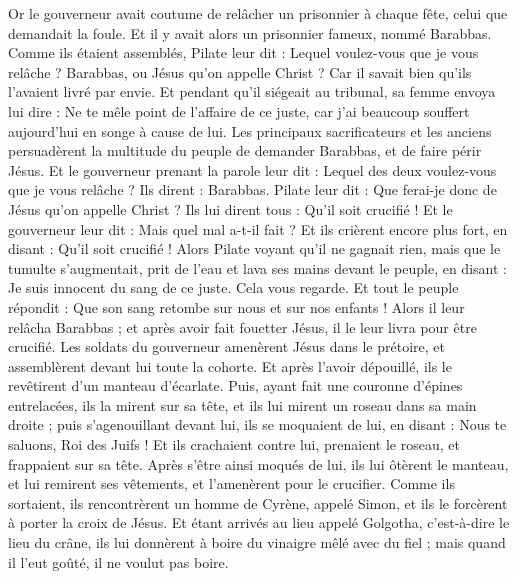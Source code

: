 \begin{multicols}{2}
Or le gouverneur avait coutume de relâcher un prisonnier à chaque fête, celui que demandait la foule.
Et il y avait alors un prisonnier fameux, nommé Barabbas.
Comme ils étaient assemblés, Pilate leur dit : Lequel voulez-vous que je vous relâche ? Barabbas, ou Jésus qu'on appelle Christ ?
Car il savait bien qu'ils l'avaient livré par envie.
Et pendant qu'il siégeait au tribunal, sa femme envoya lui dire : Ne te mêle point de l'affaire de ce juste, car j'ai beaucoup souffert aujourd'hui en songe à cause de lui.
Les principaux sacrificateurs et les anciens persuadèrent la multitude du peuple de demander Barabbas, et de faire périr Jésus.
Et le gouverneur prenant la parole leur dit : Lequel des deux voulez-vous que je vous relâche ? Ils dirent : Barabbas.
Pilate leur dit : Que ferai-je donc de Jésus qu'on appelle Christ ? Ils lui dirent tous : Qu'il soit crucifié !
Et le gouverneur leur dit : Mais quel mal a-t-il fait ? Et ils crièrent encore plus fort, en disant : Qu'il soit crucifié !
Alors Pilate voyant qu'il ne gagnait rien, mais que le tumulte s'augmentait, prit de l'eau et lava ses mains devant le peuple, en disant : Je suis innocent du sang de ce juste. Cela vous regarde.
Et tout le peuple répondit : Que son sang retombe sur nous et sur nos enfants !
Alors il leur relâcha Barabbas ; et après avoir fait fouetter Jésus, il le leur livra pour être crucifié.
Les soldats du gouverneur amenèrent Jésus dans le prétoire, et assemblèrent devant lui toute la cohorte.
Et après l'avoir dépouillé, ils le revêtirent d'un manteau d'écarlate.
Puis, ayant fait une couronne d'épines entrelacées, ils la mirent sur sa tête, et ils lui mirent un roseau dans sa main droite ; puis s'agenouillant devant lui, ils se moquaient de lui, en disant : Nous te saluons, Roi des Juifs !
Et ils crachaient contre lui, prenaient le roseau, et frappaient sur sa tête.
Après s'être ainsi moqués de lui, ils lui ôtèrent le manteau, et lui remirent ses vêtements, et l'amenèrent pour le crucifier.
Comme ils sortaient, ils rencontrèrent un homme de Cyrène, appelé Simon, et ils le forcèrent à porter la croix de Jésus.
Et étant arrivés au lieu appelé Golgotha, c'est-à-dire le lieu du crâne,
ils lui donnèrent à boire du vinaigre mêlé avec du fiel ; mais quand il l'eut goûté, il ne voulut pas boire.

\end{multicols}
